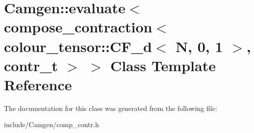 \hypertarget{a00150}{\section{Camgen\-:\-:evaluate$<$ compose\-\_\-contraction$<$ colour\-\_\-tensor\-:\-:C\-F\-\_\-d$<$ N, 0, 1 $>$, contr\-\_\-t $>$ $>$ Class Template Reference}
\label{a00150}
}


The documentation for this class was generated from the following file\-:\begin{DoxyCompactItemize}
\item 
include/\-Camgen/comp\-\_\-contr.\-h\end{DoxyCompactItemize}

